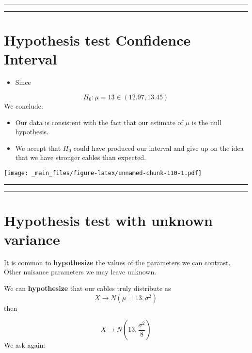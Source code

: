 \documentclass[
]{book}
\providecommand{\tightlist}{%
  \setlength{\itemsep}{0pt}\setlength{\parskip}{0pt}}
\begin{document}
\begin{center}\rule{0.5\linewidth}{0.5pt}\end{center}

\begin{center}\rule{0.5\linewidth}{0.5pt}\end{center}

\hypertarget{hypothesis-test-confidence-interval-1}{%
\section{Hypothesis test Confidence Interval}\label{hypothesis-test-confidence-interval-1}}

\begin{itemize}
\tightlist
\item
  Since
\end{itemize}

\[H_0: \mu=13 \in (12.97,13.45)\]
We conclude:

\begin{itemize}
\item
  Our data is consistent with the fact that our estimate of \(\mu\) is the null hypothesis.
\item
  We accept that \(H_0\) could have produced our interval and give up on the idea that we have stronger cables than expected.
\end{itemize}

\texttt{[image: \_main\_files/figure-latex/unnamed-chunk-110-1.pdf]}

\begin{center}\rule{0.5\linewidth}{0.5pt}\end{center}

\begin{center}\rule{0.5\linewidth}{0.5pt}\end{center}

\hypertarget{hypothesis-test-with-unknown-variance}{%
\section{Hypothesis test with unknown variance}\label{hypothesis-test-with-unknown-variance}}

It is common to \textbf{hypothesize} the values of the parameters we can contrast. Other nuisance parameters we may leave unknown.

We can \textbf{hypothesize} that our cables truly distribute as \[X \rightarrow N(\mu=13, \sigma^2)\] then

\[\bar{X} \rightarrow N(13, \frac{\sigma^2}{8})\]
We ask again:
\end{document}
